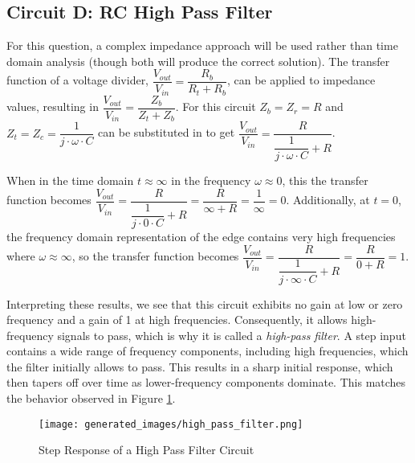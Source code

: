 \documentclass[main.tex]{subfiles}
\begin{document}
\subsection{Circuit D: RC High Pass Filter}
For this question, a complex impedance approach will be used rather than time domain analysis (though both will produce the correct solution). The transfer function of a voltage divider, $\dfrac{V_{out}}{V_{in}} = \dfrac{R_b}{R_t + R_b}$, can be applied to impedance values, resulting in $\dfrac{V_{out}}{V_{in}} = \dfrac{Z_b}{Z_t + Z_b}$. For this circuit $Z_b = Z_r = R$ and $Z_t = Z_c = \dfrac{1}{j \cdot \omega \cdot C}$ can be substituted in to get $\dfrac{V_{out}}{V_{in}} = \dfrac{R}{\dfrac{1}{j \cdot \omega \cdot C} + R}$. \newline

\newnoindentpara When in the time domain $t \approx \infty$ in the frequency $\omega \approx 0$, this the transfer function becomes $\dfrac{V_{out}}{V_{in}} = \dfrac{R}{\dfrac{1}{j \cdot 0 \cdot C} + R} = \dfrac{R}{\infty + R} = \dfrac{1}{\infty} = 0$. Additionally, at $t = 0$, the frequency domain representation of the edge contains very high frequencies where $\omega \approx \infty$, so the transfer function becomes $\dfrac{V_{out}}{V_{in}} = \dfrac{R}{\dfrac{1}{j \cdot \infty \cdot C} + R} = \dfrac{R}{0 + R} = 1$. \newline
\newline

\newnoindentpara Interpreting these results, we see that this circuit exhibits no gain at low or zero frequency and a gain of 1 at high frequencies. Consequently, it allows high-frequency signals to pass, which is why it is called a \textit{high-pass filter}. A step input contains a wide range of frequency components, including high frequencies, which the filter initially allows to pass. This results in a sharp initial response, which then tapers off over time as lower-frequency components dominate. This matches the behavior observed in Figure \ref{fig:step-response-high-pass-filter}.

\begin{figure}[H]
    \centering
    \texttt{[image: generated\_images/high\_pass\_filter.png]}
    \caption{Step Response of a High Pass Filter Circuit}
    \label{fig:step-response-high-pass-filter}
\end{figure}

\end{document}
